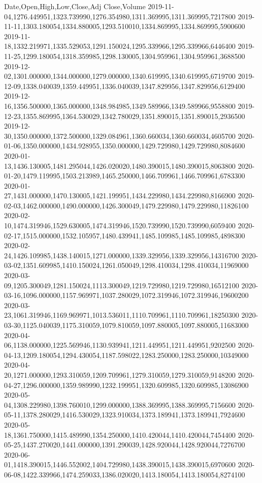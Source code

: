 \documentclass{article}
\begin{document}
\begin{eulernotebook}
\begin{eulercomment}
\begin{eulercomment}
\begin{euleroutput}
  Date,Open,High,Low,Close,Adj Close,Volume
  2019-11-04,1276.449951,1323.739990,1276.354980,1311.369995,1311.369995,7217800
  2019-11-11,1303.180054,1334.880005,1293.510010,1334.869995,1334.869995,5900600
  2019-11-18,1332.219971,1335.529053,1291.150024,1295.339966,1295.339966,6446400
  2019-11-25,1299.180054,1318.359985,1298.130005,1304.959961,1304.959961,3688500
  2019-12-02,1301.000000,1344.000000,1279.000000,1340.619995,1340.619995,6719700
  2019-12-09,1338.040039,1359.449951,1336.040039,1347.829956,1347.829956,6129400
  2019-12-16,1356.500000,1365.000000,1348.984985,1349.589966,1349.589966,9558800
  2019-12-23,1355.869995,1364.530029,1342.780029,1351.890015,1351.890015,2936500
  2019-12-30,1350.000000,1372.500000,1329.084961,1360.660034,1360.660034,4605700
  2020-01-06,1350.000000,1434.928955,1350.000000,1429.729980,1429.729980,8084600
  2020-01-13,1436.130005,1481.295044,1426.020020,1480.390015,1480.390015,8063800
  2020-01-20,1479.119995,1503.213989,1465.250000,1466.709961,1466.709961,6783300
  2020-01-27,1431.000000,1470.130005,1421.199951,1434.229980,1434.229980,8166900
  2020-02-03,1462.000000,1490.000000,1426.300049,1479.229980,1479.229980,11826100
  2020-02-10,1474.319946,1529.630005,1474.319946,1520.739990,1520.739990,6059400
  2020-02-17,1515.000000,1532.105957,1480.439941,1485.109985,1485.109985,4898300
  2020-02-24,1426.109985,1438.140015,1271.000000,1339.329956,1339.329956,14316700
  2020-03-02,1351.609985,1410.150024,1261.050049,1298.410034,1298.410034,11969000
  2020-03-09,1205.300049,1281.150024,1113.300049,1219.729980,1219.729980,16512100
  2020-03-16,1096.000000,1157.969971,1037.280029,1072.319946,1072.319946,19600200
  2020-03-23,1061.319946,1169.969971,1013.536011,1110.709961,1110.709961,18250300
  2020-03-30,1125.040039,1175.310059,1079.810059,1097.880005,1097.880005,11683000
  2020-04-06,1138.000000,1225.569946,1130.939941,1211.449951,1211.449951,9202500
  2020-04-13,1209.180054,1294.430054,1187.598022,1283.250000,1283.250000,10349000
  2020-04-20,1271.000000,1293.310059,1209.709961,1279.310059,1279.310059,9148200
  2020-04-27,1296.000000,1359.989990,1232.199951,1320.609985,1320.609985,13086900
  2020-05-04,1308.229980,1398.760010,1299.000000,1388.369995,1388.369995,7156600
  2020-05-11,1378.280029,1416.530029,1323.910034,1373.189941,1373.189941,7924600
  2020-05-18,1361.750000,1415.489990,1354.250000,1410.420044,1410.420044,7454400
  2020-05-25,1437.270020,1441.000000,1391.290039,1428.920044,1428.920044,7276700
  2020-06-01,1418.390015,1446.552002,1404.729980,1438.390015,1438.390015,6970600
  2020-06-08,1422.339966,1474.259033,1386.020020,1413.180054,1413.180054,8274100

\end{euleroutput}
\end{eulercomment}
\end{eulercomment}
\end{eulernotebook}
\end{document}
